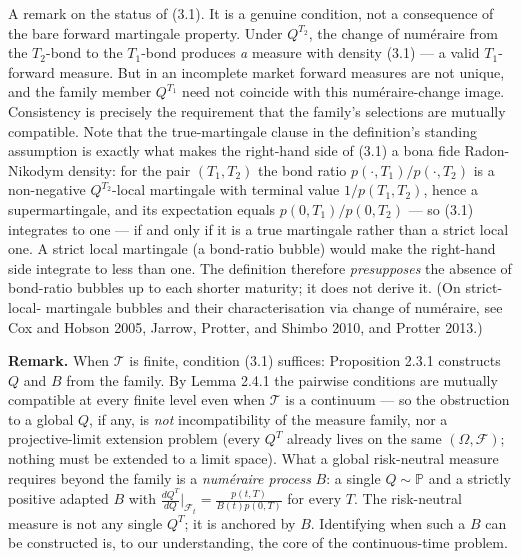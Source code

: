 \documentclass[
]{article}
\begin{document}
A remark on the status of (3.1). It is a genuine condition, not a
consequence of the bare forward martingale property. Under \(Q^{T_2}\),
the change of numéraire from the \(T_2\)-bond to the \(T_1\)-bond
produces \emph{a} measure with density (3.1) --- a valid \(T_1\)-forward
measure. But in an incomplete market forward measures are not unique,
and the family member \(Q^{T_1}\) need not coincide with this
numéraire-change image. Consistency is precisely the requirement that
the family's selections are mutually compatible. Note that the
true-martingale clause in the definition's standing assumption is
exactly what makes the right-hand side of (3.1) a bona fide
Radon-Nikodym density: for the pair \((T_1,T_2)\) the bond ratio
\(p(\cdot,T_1)/p(\cdot,T_2)\) is a non-negative \(Q^{T_2}\)-local
martingale with terminal value \(1/p(T_1,T_2)\), hence a
supermartingale, and its expectation equals \(p(0,T_1)/p(0,T_2)\) --- so
(3.1) integrates to one --- if and only if it is a true martingale
rather than a strict local one. A strict local martingale (a bond-ratio
bubble) would make the right-hand side integrate to less than one. The
definition therefore \emph{presupposes} the absence of bond-ratio
bubbles up to each shorter maturity; it does not derive it. (On
strict-local- martingale bubbles and their characterisation via change
of numéraire, see Cox and Hobson 2005, Jarrow, Protter, and Shimbo 2010,
and Protter 2013.)

\textbf{Remark.} When \(\mathcal{T}\) is finite, condition (3.1)
suffices: Proposition 2.3.1 constructs \(Q\) and \(B\) from the family.
By Lemma 2.4.1 the pairwise conditions are mutually compatible at every
finite level even when \(\mathcal{T}\) is a continuum --- so the
obstruction to a global \(Q\), if any, is \emph{not} incompatibility of
the measure family, nor a projective-limit extension problem (every
\(Q^T\) already lives on the same \((\Omega, \mathcal{F})\); nothing
must be extended to a limit space). What a global risk-neutral measure
requires beyond the family is a \emph{numéraire process} \(B\): a single
\(Q \sim \mathbb{P}\) and a strictly positive adapted \(B\) with
\(\frac{dQ^T}{dQ}\big|_{\mathcal{F}_t} = \frac{p(t,T)}{B(t) p(0,T)}\)
for every \(T\). The risk-neutral measure is not any single \(Q^T\); it
is anchored by \(B\). Identifying when such a \(B\) can be constructed
is, to our understanding, the core of the continuous-time problem.
\end{document}
